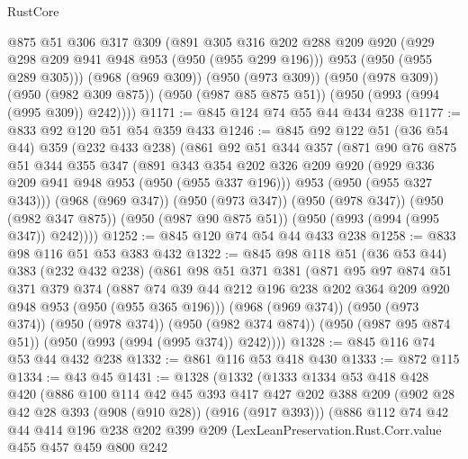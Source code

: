 \begin{lexlean}{RustCore}
\begin{coremodule}
        @875
        @51
        @306
        @317
        @309
        (@891
          @305
          @316
          @202
          @288
          @209
          @920
          (@929 @298 @209 @941 @948 @953 (@950 (@955 @299 @196)))
          @953
          (@950 (@955 @289 @305)))
        (@968 (@969 @309))
        (@950 (@973 @309))
        (@950 (@978 @309))
        (@950 (@982 @309 @875))
        (@950 (@987 @85 @875 @51))
        (@950 (@993 (@994 (@995 @309)) @242))))
@1171 := @845 @124 @74 @55 @44 @434 @238
@1177 := @833 @92 @120 @51 @54 @359 @433
@1246 := @845
    @92
    @122
    @51
    (@36 @54 @44)
    @359
    (@232 @433 @238)
    (@861
      @92
      @51
      @344
      @357
      (@871
        @90
        @76
        @875
        @51
        @344
        @355
        @347
        (@891
          @343
          @354
          @202
          @326
          @209
          @920
          (@929 @336 @209 @941 @948 @953 (@950 (@955 @337 @196)))
          @953
          (@950 (@955 @327 @343)))
        (@968 (@969 @347))
        (@950 (@973 @347))
        (@950 (@978 @347))
        (@950 (@982 @347 @875))
        (@950 (@987 @90 @875 @51))
        (@950 (@993 (@994 (@995 @347)) @242))))
@1252 := @845 @120 @74 @54 @44 @433 @238
@1258 := @833 @98 @116 @51 @53 @383 @432
@1322 := @845
    @98
    @118
    @51
    (@36 @53 @44)
    @383
    (@232 @432 @238)
    (@861
      @98
      @51
      @371
      @381
      (@871
        @95
        @97
        @874
        @51
        @371
        @379
        @374
        (@887 @74 @39 @44 @212 @196 @238 @202 @364 @209 @920 @948 @953 (@950 (@955 @365 @196)))
        (@968 (@969 @374))
        (@950 (@973 @374))
        (@950 (@978 @374))
        (@950 (@982 @374 @874))
        (@950 (@987 @95 @874 @51))
        (@950 (@993 (@994 (@995 @374)) @242))))
@1328 := @845 @116 @74 @53 @44 @432 @238
@1332 := @861 @116 @53 @418 @430
@1333 := @872 @115
@1334 := @43 @45
@1431 := @1328
    (@1332
      (@1333
        @1334
        @53
        @418
        @428
        @420
        (@886
          @100
          @114
          @42
          @45
          @393
          @417
          @427
          @202
          @388
          @209
          (@902 @28 @42 @28 @393 (@908 (@910 @28)) (@916 (@917 @393)))
          (@886
            @112
            @74
            @42
            @44
            @414
            @196
            @238
            @202
            @399
            @209
            (LexLeanPreservation.Rust.Corr.value
              @455
              @457
              @459
              @800
              @242

\end{coremodule}
\end{lexlean}
